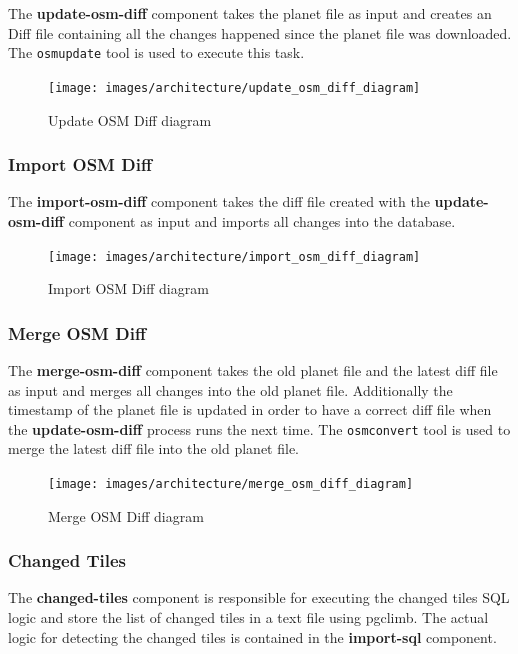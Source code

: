 The \textbf{update-osm-diff} component takes the planet file as input and creates an \osm{} Diff file containing all the changes happened since the planet file was downloaded. The \texttt{osmupdate} tool is used to execute this task.

\begin{figure}[H]
  \centering
  \texttt{[image: images/architecture/update\_osm\_diff\_diagram]}
  \caption{Update OSM Diff diagram}
\end{figure}

\subsubsection{Import OSM Diff}

The \textbf{import-osm-diff} component takes the \osm{} diff file created with the \textbf{update-osm-diff} component as input and imports all changes into the database.

\begin{figure}[H]
  \centering
  \texttt{[image: images/architecture/import\_osm\_diff\_diagram]}
  \caption{Import OSM Diff diagram}
\end{figure}

\subsubsection{Merge OSM Diff}

The \textbf{merge-osm-diff} component takes the old planet file and the latest diff file as input and merges all changes into the old planet file. Additionally the timestamp of the planet file is updated in order to have a correct diff file when the \textbf{update-osm-diff} process runs the next time. The \texttt{osmconvert} tool is used to merge the latest diff file into the old planet file.

\begin{figure}[H]
  \centering
  \texttt{[image: images/architecture/merge\_osm\_diff\_diagram]}
  \caption{Merge OSM Diff diagram}
\end{figure}

\subsubsection{Changed Tiles}

The \textbf{changed-tiles} component is responsible for executing the changed tiles SQL logic and store the list of changed tiles in a text file using pgclimb. The actual logic for detecting the changed tiles is contained in the \textbf{import-sql} component.

